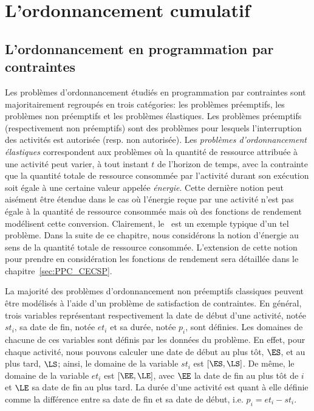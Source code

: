 \section{L'ordonnancement cumulatif}
\label{sec:cumu}

\subsection{L'ordonnancement en programmation par contraintes}
\label{sec:cumu_ordo}

Les problèmes d'ordonnancement étudiés en programmation par
contraintes sont majoritairement regroupés en trois catégories: les
problèmes préemptifs, les problèmes non préemptifs et les problèmes
élastiques. Les problèmes préemptifs (respectivement non préemptifs)
sont des problèmes pour lesquels l'interruption des activités est
autorisée (resp. non autorisée). Les {\it problèmes d'ordonnancement
élastiques} correspondent aux problèmes où la quantité de ressource
attribuée à une activité peut varier, à tout instant $t$ de l'horizon
de temps, avec la contrainte que la quantité totale de ressource
consommée par l'activité durant son exécution soit égale à une
certaine valeur appelée {\it énergie}. Cette dernière notion peut
aisément être étendue dans le cas où l'énergie reçue par une activité
n'est pas égale à la quantité de ressource consommée mais où des
fonctions de rendement modélisent cette conversion. Clairement, le
\CECSP~est un exemple typique d'un tel problème. Dans la suite de ce
chapitre, nous considérons la notion d'énergie au sens de la quantité
totale de ressource consommée. L'extension de cette notion pour
prendre en considération les fonctions de rendement sera détaillée
dans le chapitre~\ref{sec:PPC_CECSP}.

La majorité des problèmes d'ordonnancement non préemptifs classiques
peuvent être modélisés à l'aide d'un problème de satisfaction de
contraintes. En général, trois variables représentant respectivement
la date de début d'une activité, notée $st_i$, sa date de fin, notée
$et_i$ et sa durée, notée $p_i$, sont définies. Les domaines de
chacune de ces variables sont définis par les données du problème. En
effet, pour chaque activité, nous pouvons calculer une date de début
au plus tôt, $\ES$, et au plus tard, $\LS$; ainsi, le domaine de la
variable $st_i$ est $[\ES,\LS]$. De même, le domaine de la variable
$et_i$ est $[\EE,\LE]$, avec $\EE$ la date de fin au plus tôt de $i$
et $\LE$ sa date de fin au plus tard. La durée d'une activité est
quant à elle définie comme la différence entre sa date de fin et sa
date de début, i.e. $p_i=et_i-st_i$.

